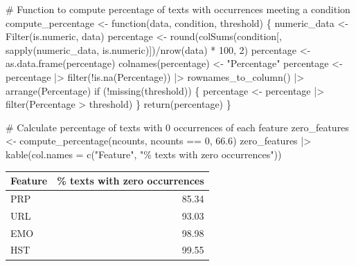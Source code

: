 \documentclass[
  letterpaper,
  DIV=11,
  numbers=noendperiod]{scrreprt}
\newenvironment{Shaded}{\begin{snugshade}}{\end{snugshade}}
\newcommand{\AttributeTok}[1]{\textcolor[rgb]{0.40,0.45,0.13}{#1}}
\newcommand{\CommentTok}[1]{\textcolor[rgb]{0.37,0.37,0.37}{#1}}
\newcommand{\ControlFlowTok}[1]{\textcolor[rgb]{0.00,0.23,0.31}{#1}}
\newcommand{\DecValTok}[1]{\textcolor[rgb]{0.68,0.00,0.00}{#1}}
\newcommand{\FloatTok}[1]{\textcolor[rgb]{0.68,0.00,0.00}{#1}}
\newcommand{\FunctionTok}[1]{\textcolor[rgb]{0.28,0.35,0.67}{#1}}
\newcommand{\NormalTok}[1]{\textcolor[rgb]{0.00,0.23,0.31}{#1}}
\newcommand{\OtherTok}[1]{\textcolor[rgb]{0.00,0.23,0.31}{#1}}
\newcommand{\SpecialCharTok}[1]{\textcolor[rgb]{0.37,0.37,0.37}{#1}}
\newcommand{\StringTok}[1]{\textcolor[rgb]{0.13,0.47,0.30}{#1}}
\begin{document}
\begin{Shaded}
\begin{Highlighting}[]
\CommentTok{\# Function to compute percentage of texts with occurrences meeting a condition}
\NormalTok{compute\_percentage }\OtherTok{\textless{}{-}} \ControlFlowTok{function}\NormalTok{(data, condition, threshold) \{}
\NormalTok{  numeric\_data }\OtherTok{\textless{}{-}} \FunctionTok{Filter}\NormalTok{(is.numeric, data)}
\NormalTok{  percentage }\OtherTok{\textless{}{-}} \FunctionTok{round}\NormalTok{(}\FunctionTok{colSums}\NormalTok{(condition[, }\FunctionTok{sapply}\NormalTok{(numeric\_data, is.numeric)])}\SpecialCharTok{/}\FunctionTok{nrow}\NormalTok{(data) }\SpecialCharTok{*} \DecValTok{100}\NormalTok{, }\DecValTok{2}\NormalTok{)}
\NormalTok{  percentage }\OtherTok{\textless{}{-}} \FunctionTok{as.data.frame}\NormalTok{(percentage)}
  \FunctionTok{colnames}\NormalTok{(percentage) }\OtherTok{\textless{}{-}} \StringTok{"Percentage"}
\NormalTok{  percentage }\OtherTok{\textless{}{-}}\NormalTok{ percentage }\SpecialCharTok{|\textgreater{}} 
    \FunctionTok{filter}\NormalTok{(}\SpecialCharTok{!}\FunctionTok{is.na}\NormalTok{(Percentage)) }\SpecialCharTok{|\textgreater{}}
    \FunctionTok{rownames\_to\_column}\NormalTok{() }\SpecialCharTok{|\textgreater{}}
    \FunctionTok{arrange}\NormalTok{(Percentage)}
  \ControlFlowTok{if}\NormalTok{ (}\SpecialCharTok{!}\FunctionTok{missing}\NormalTok{(threshold)) \{}
\NormalTok{    percentage }\OtherTok{\textless{}{-}}\NormalTok{ percentage }\SpecialCharTok{|\textgreater{}} 
      \FunctionTok{filter}\NormalTok{(Percentage }\SpecialCharTok{\textgreater{}}\NormalTok{ threshold)}
\NormalTok{  \}}
  \FunctionTok{return}\NormalTok{(percentage)}
\NormalTok{\}}

\CommentTok{\# Calculate percentage of texts with 0 occurrences of each feature}
\NormalTok{zero\_features }\OtherTok{\textless{}{-}} \FunctionTok{compute\_percentage}\NormalTok{(ncounts, ncounts }\SpecialCharTok{==} \DecValTok{0}\NormalTok{, }\FloatTok{66.6}\NormalTok{)}
\NormalTok{zero\_features }\SpecialCharTok{|\textgreater{}} 
  \FunctionTok{kable}\NormalTok{(}\AttributeTok{col.names =} \FunctionTok{c}\NormalTok{(}\StringTok{"Feature"}\NormalTok{, }\StringTok{"\% texts with zero occurrences"}\NormalTok{))}
\end{Highlighting}
\end{Shaded}

\begin{longtable}[]{@{}lr@{}}
\toprule\noalign{}
Feature & \% texts with zero occurrences \\
\midrule\noalign{}
\endhead
\bottomrule\noalign{}
\endlastfoot
PRP & 85.34 \\
URL & 93.03 \\
EMO & 98.98 \\
HST & 99.55 \\
\end{longtable}
\end{document}
